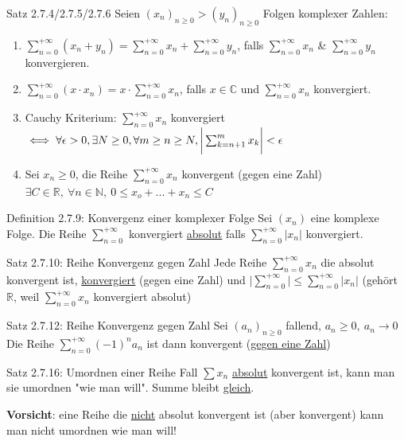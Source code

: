 \documentclass[a4paper,10pt]{article}
\begin{document}
\begin{tbox}
    {Satz 2.7.4/2.7.5/2.7.6}
    Seien $(x_n)_{n\ge 0} >(y_n)_{n\ge0}$ Folgen komplexer Zahlen:
    \begin{enumerate}
        \item $\sum_{n=0}^{+\infty} (x_n+y_n)=\sum_{n=0}^{+\infty} x_n+\sum_{n=0}^{+\infty} y_n$, falls $\sum_{n=0}^{+\infty} x_n$ \& $\sum_{n=0}^{+\infty} y_n$ konvergieren.
        \item $\sum_{n=0}^{+\infty} (x\cdot x_n) = x \cdot\sum_{n=0}^{+\infty} x_n$, falls $x\in \mathbb C$ und $\sum_{n=0}^{+\infty}x_n$ konvergiert.
        \item Cauchy Kriterium: $\sum_{n=0}^{+\infty} x_n$ konvergiert $\iff \forall \epsilon >0, \exists N\ge0, \forall m\ge n\ge N, 
        \\\bigg|\sum_{k=n+1}^{m} x_k \bigg|<\epsilon$
        \item Sei $x_n\ge 0$, die Reihe $\sum_{n=0}^{+\infty}x_n$ konvergent (gegen eine Zahl) $\exists C \in \mathbb R, \ \forall n \in \mathbb N,\ 0\le x_o+...+x_n\le C$
    \end{enumerate}
\end{tbox}
\begin{defbox}
    {Definition 2.7.9: Konvergenz einer komplexer Folge}
    Sei $(x_n)$ eine komplexe Folge. Die Reihe $\sum_{n=0}^{+\infty}$ konvergiert \underline{absolut} falls $\sum_{n=0}^{+\infty}|x_n|$ konvergiert.
\end{defbox}
\begin{tbox}
    {Satz 2.7.10: Reihe Konvergenz gegen Zahl}  
    Jede Reihe $\sum_{n=0}^{+\infty}x_n$ die absolut konvergent ist, \underline{konvergiert} (gegen eine Zahl) und $\big|\sum_{n=0}^{+\infty}\big|\le\sum_{n=0}^{+\infty}|x_n|$ (gehört $\mathbb R$, weil $\sum_{n=0}^{+\infty}x_n$ konvergiert absolut)
\end{tbox} 
\begin{tbox}
    {Satz 2.7.12: Reihe Konvergenz gegen Zahl}
    Sei $(a_n)_{n\ge0}$ fallend, $ a_n\ge 0, \ a_n\longrightarrow 0$ Die Reihe $\sum_{n=0}^{+\infty}(-1)^na_n$ ist dann konvergent (\underline{gegen eine Zahl})
\end{tbox}
\begin{tbox}
    {Satz 2.7.16: Umordnen einer Reihe}
    Fall $\sum x_n$ \underline{absolut} konvergent ist, kann man sie umordnen "wie man will". Summe bleibt \underline{gleich}.
\end{tbox}
\begin{flushleft}
    \textbf{Vorsicht}: eine Reihe die \underline{nicht} absolut konvergent ist (aber konvergent) kann man nicht umordnen wie man will!
\end{flushleft}
\end{document}
